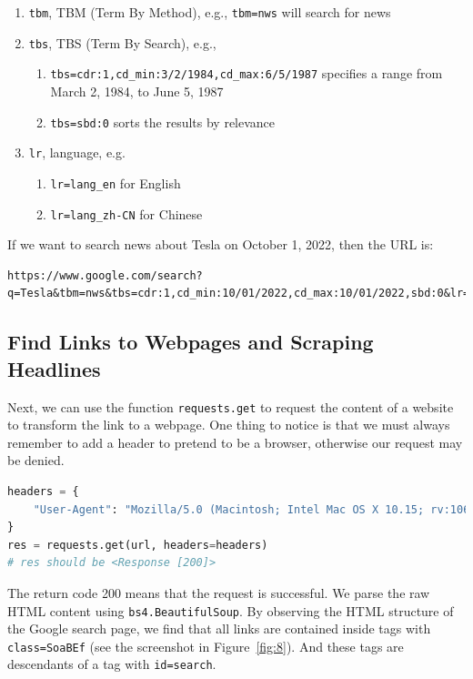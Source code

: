 \documentclass[a4paper, 11pt]{my-elegantpaper}
\begin{document}
\begin{enumerate}
    \item \texttt{tbm}, TBM (Term By Method), e.g., \texttt{tbm=nws} will search for news
    \item \texttt{tbs}, TBS (Term By Search), e.g.,
    \begin{enumerate}
        \item \verb|tbs=cdr:1,cd_min:3/2/1984,cd_max:6/5/1987| specifies a range from March 2, 1984, to June 5, 1987
        \item \texttt{tbs=sbd:0} sorts the results by relevance
    \end{enumerate}
    \item \texttt{lr}, language, e.g.
    \begin{enumerate}
        \item \verb|lr=lang_en| for English
        \item \verb|lr=lang_zh-CN| for Chinese
    \end{enumerate}
\end{enumerate}

If we want to search news about Tesla on October 1, 2022, then the URL is: 

\begin{lstlisting}
https://www.google.com/search?q=Tesla&tbm=nws&tbs=cdr:1,cd_min:10/01/2022,cd_max:10/01/2022,sbd:0&lr=lang_en
\end{lstlisting}

\subsection{Find Links to Webpages and Scraping Headlines}

Next, we can use the function \texttt{requests.get} to request the content of a website to transform the link to a webpage. One thing to notice is that we must always remember to add a header to pretend to be a browser, otherwise our request may be denied.

\begin{lstlisting}[language=python]
headers = { 
    "User-Agent": "Mozilla/5.0 (Macintosh; Intel Mac OS X 10.15; rv:106.0) Gecko/20100101 Firefox/106.0"
}
res = requests.get(url, headers=headers)
# res should be <Response [200]>
\end{lstlisting}

The return code 200 means that the request is successful. We parse the raw HTML content using \texttt{bs4.BeautifulSoup}. By observing the HTML structure of the Google search page, we find that all links are contained inside tags with \texttt{class=SoaBEf} (see the screenshot in Figure~\ref{fig:8}). And these tags are descendants of a tag with \texttt{id=search}.
\end{document}
